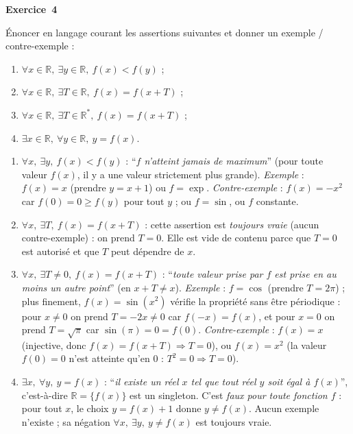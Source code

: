 \documentclass[11pt,a4paper]{article}
\newcommand{\R}{\mathbb{R}}\newcommand{\N}{\mathbb{N}}\newcommand{\Z}{\mathbb{Z}}
\begin{document}
	\medskip\noindent\textbf{\Large\color{bleu}Exercice~4}\nopagebreak
	\begin{enonce}
		Énoncer en langage courant les assertions suivantes et donner un exemple / contre-exemple :
		\begin{enumerate}
			\item $\forall x\in\mathbb{R},\ \exists y\in\mathbb{R},\ f(x)<f(y)$ ;
			\item $\forall x\in\mathbb{R},\ \exists T\in\mathbb{R},\ f(x)=f(x+T)$ ;
			\item $\forall x\in\mathbb{R},\ \exists T\in\mathbb{R}^*,\ f(x)=f(x+T)$ ;
			\item $\exists x\in\mathbb{R},\ \forall y\in\mathbb{R},\ y=f(x)$.
		\end{enumerate}
	\end{enonce}
	\begin{corrige}
		\begin{enumerate}
			\item $\forall x,\ \exists y,\ f(x)<f(y)$ : ``\emph{$f$ n'atteint jamais de maximum}'' (pour toute valeur $f(x)$, il y a une valeur strictement plus grande). \emph{Exemple} : $f(x)=x$ (prendre $y=x+1$) ou $f=\exp$. \emph{Contre-exemple} : $f(x)=-x^2$ car $f(0)=0\geq f(y)$ pour tout $y$ ; ou $f=\sin$, ou $f$ constante.
			\item $\forall x,\ \exists T,\ f(x)=f(x+T)$ : cette assertion est \emph{toujours vraie} (aucun contre-exemple) : on prend $T=0$. Elle est vide de contenu parce que $T=0$ est autorisé et que $T$ peut dépendre de $x$.
			\item $\forall x,\ \exists T\neq0,\ f(x)=f(x+T)$ : ``\emph{toute valeur prise par $f$ est prise en au moins un autre point}'' (en $x+T\neq x$). \emph{Exemple} : $f=\cos$ (prendre $T=2\pi$) ; plus finement, $f(x)=\sin(x^2)$ vérifie la propriété sans être périodique : pour $x\neq0$ on prend $T=-2x\neq0$ car $f(-x)=f(x)$, et pour $x=0$ on prend $T=\sqrt\pi$ car $\sin(\pi)=0=f(0)$. \emph{Contre-exemple} : $f(x)=x$ (injective, donc $f(x)=f(x+T)\Rightarrow T=0$), ou $f(x)=x^2$ (la valeur $f(0)=0$ n'est atteinte qu'en $0$ : $T^2=0\Rightarrow T=0$).
			\item $\exists x,\ \forall y,\ y=f(x)$ : ``\emph{il existe un réel $x$ tel que tout réel $y$ soit égal à $f(x)$}'', c'est-à-dire $\R=\{f(x)\}$ est un singleton. C'est \emph{faux pour toute fonction $f$} : pour tout $x$, le choix $y=f(x)+1$ donne $y\neq f(x)$. Aucun exemple n'existe ; sa négation $\forall x,\ \exists y,\ y\neq f(x)$ est toujours vraie.
		\end{enumerate}
	\end{corrige}
	
\end{document}
